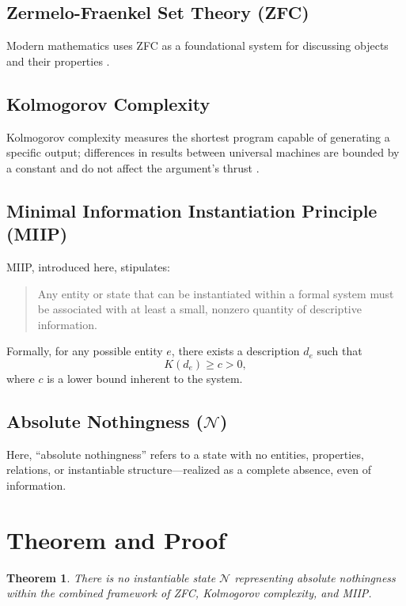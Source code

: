 \documentclass[12pt,a4paper]{article}
\newtheorem{theorem}{Theorem}
\begin{document}
\subsection{Zermelo-Fraenkel Set Theory (ZFC)}

Modern mathematics uses ZFC as a foundational system for discussing objects and their properties \cite{Jech2003}.

\subsection{Kolmogorov Complexity}

Kolmogorov complexity measures the shortest program capable of generating a specific output; differences in results between universal machines are bounded by a constant and do not affect the argument’s thrust \cite{Kolmogorov1965, Chaitin1966, LiVitanyi2008}.

\subsection{Minimal Information Instantiation Principle (MIIP)}

MIIP, introduced here, stipulates:

\begin{quote}
Any entity or state that can be instantiated within a formal system must be associated with at least a small, nonzero quantity of descriptive information.
\end{quote}

Formally, for any possible entity $e$, there exists a description $d_e$ such that
\[
K(d_e) \geq c > 0,
\]
where $c$ is a lower bound inherent to the system.

\subsection{Absolute Nothingness ($\mathcal{N}$)}

Here, ``absolute nothingness'' refers to a state with no entities, properties, relations, or instantiable structure---realized as a complete absence, even of information.

\section{Theorem and Proof}

\begin{theorem}
There is no instantiable state $\mathcal{N}$ representing absolute nothingness within the combined framework of ZFC, Kolmogorov complexity, and MIIP.
\end{theorem}
\end{document}
